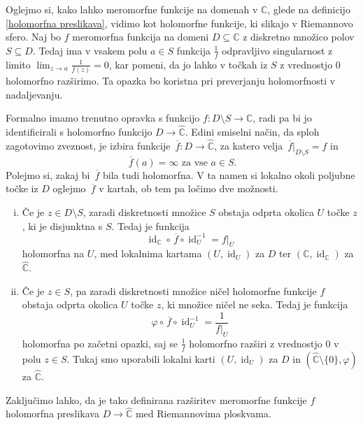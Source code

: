 \documentclass[mat1]{fmfdelo}
\numberwithin{equation}{section}
\newcommand{\C}{\mathbb C}
\newcommand{\RS}{\widehat{\C}}
\newcommand{\inv}{^{-1}}
\newcommand{\olsi}[1]{\,\overline{\!{#1}}} %
\DeclareMathOperator{\id}{id}
\theoremstyle{definition}
\begin{document}

\begin{zgled*}
    \label{meromorfne so holomorfne v R.sfero}
    Oglejmo si, kako lahko meromorfne funkcije na domenah v $\C$, glede na definicijo \ref{holomorfna preslikava}, vidimo kot holomorfne funkcije, ki slikajo v Riemannovo sfero. Naj bo $f$ meromorfna funkcija na domeni $D \subseteq \C$ z diskretno množico polov $S \subseteq D$. Tedaj ima v vsakem polu $a \in S$ funkcija $\frac1f$ odpravljivo singularnost z limito $\lim_{z \to a} \frac{1}{f(z)} = 0$, kar pomeni, da jo lahko v točkah iz $S$ z vrednostjo $0$ holomorfno razširimo. Ta opazka bo koristna pri preverjanju holomorfnosti v nadaljevanju. 
    
    Formalno imamo trenutno opravka s funkcijo $f: D\setminus S \to \C$, radi pa bi jo identificirali s holomorfno funkcijo $D \to \RS$. Edini smiselni način, da sploh zagotovimo zveznost, je izbira funkcije $\olsi{f} : D \to \RS$, za katero velja $\olsi{f}|_{D\setminus S} = f$ in 
    \[
        \olsi{f}(a) = \infty \text{ za vse } a \in S.  
    \]
    Polejmo si, zakaj bi $\olsi{f}$ bila tudi holomorfna. V ta namen si lokalno okoli poljubne točke iz $D$ oglejmo $\olsi{f}$ v kartah, ob tem pa ločimo dve možnosti.
    \begin{enumerate}[(i)]
        \item Če je $z \in D\setminus S$, zaradi diskretnosti množice $S$ obstaja odprta okolica $U$ točke $z$, ki je disjunktna s $S$. Tedaj je funkcija
        \[
            \id_\C \circ \olsi{f} \circ \id_U\inv = f|_U  
        \]
        holomorfna na $U$, med lokalnima kartama $(U, \id_U)$ za $D$ ter $(\C, \id_\C)$ za $\RS$.
        
        \item Če je $z \in S$, pa zaradi diskretnosti množice ničel holomorfne funkcije $f$ obstaja odprta okolica $U$ točke $z$, ki množice ničel ne seka. Tedaj je funkcija
        \[
            \varphi \circ \olsi{f} \circ \id_U\inv = \frac{1}{f|_U}
        \]
        holomorfna po začetni opazki, saj se $\frac{1}{f}$ holomorfno razširi z vrednostjo $0$ v polu $z \in S$. Tukaj smo uporabili lokalni karti $(U, \id_U)$ za $D$ in $(\RS \setminus \{0\}, \varphi)$ za $\RS$.
    \end{enumerate}
    Zaključimo lahko, da je tako definirana razširitev meromorfne funkcije $f$ holomorfna preslikava $D \to \RS$ med Riemannovima ploskvama.


\end{zgled*}
\end{document}
